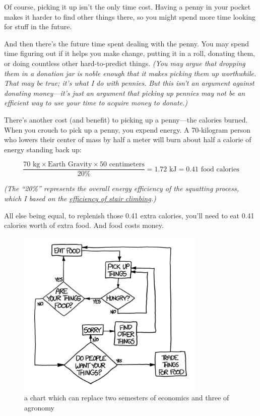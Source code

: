 {Of course, picking it up isn’t the only time cost. Having a penny in your pocket makes it harder to find other things there, so you might spend more time looking for stuff in the future.}

{And then there’s the future time spent dealing with the penny. You may spend time figuring out if it helps you make change, putting it in a roll, donating them, or doing countless other hard-to-predict things. \emph{(You may argue that dropping them in a donation jar is noble enough that it makes picking them up worthwhile. That may be true; it’s what I do with pennies. But this isn’t an argument against donating money—it’s just an argument that picking up pennies may not be an efficient way to use your time to acquire money to donate.)} }

{There’s another cost (and benefit) to picking up a penny—the calories burned. When you crouch to pick up a penny, you expend energy. A 70-kilogram person who lowers their center of mass by half a meter will burn about half a calorie of energy standing back up:}

{\[\frac{70\text{ kg}\times\text{Earth Gravity}\times50\text{ centimeters}}{20\%}=1.72\text{ kJ}=0.41\text{ food calories}\]}

{ \emph{(The “20\%” represents the overall energy efficiency of the squatting process, which I based on the \href{http://phys.org/news/2011-03-energy-bill-stair-climbing.html}{efficiency of stair climbing}.)} }

{All else being equal, to replenish those 0.41 extra calories, you’ll need to eat 0.41 calories worth of extra food. And food costs money.}

\begin{figure}[!htbp]
\centering
\includegraphics[scale=0.5, max width=0.8\textwidth]{imgs/a/22/pennies_food.png}
\caption{a chart which can replace two semesters of economics and three of agronomy}
\end{figure}

